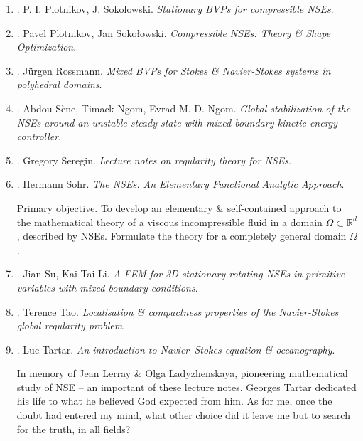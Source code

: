 \documentclass{article}
\begin{document}
\begin{enumerate}
	\item \cite{Plotnikov_Sokolowski2008}. {\sc P. I. Plotnikov, J. Sokolowski}. {\it Stationary BVPs for compressible NSEs}.
	\item \cite{Plotnikov_Sokolowski2012}. {\sc Pavel Plotnikov, Jan Soko\l owski}. {\it Compressible NSEs: Theory \& Shape Optimization}.
	\item \cite{Rossmann2009}. {\sc J\"{u}rgen Rossmann}. {\it Mixed BVPs for Stokes \& Navier-Stokes systems in polyhedral domains}.
	\item \cite{Sene_Ngom_Ngom2019}. {\sc Abdou S\`ene, Timack Ngom, Evrad M. D. Ngom}. {\it Global stabilization of the NSEs around an unstable steady state with mixed boundary kinetic energy controller}.
	\item \cite{Seregin2015}. {\sc Gregory Seregin}. {\it Lecture notes on regularity theory for NSEs}.	 
	\item \cite{Sohr2001,Sohr2013}. {\sc Hermann Sohr}. {\it The NSEs: An Elementary Functional Analytic Approach}.
	
	{\sf Primary objective.} To develop an elementary \& self-contained approach to the mathematical theory of a viscous incompressible fluid in a domain $\Omega\subset\mathbb{R}^d$, described by NSEs. Formulate the theory for a completely general domain $\Omega$.
	\item \cite{Su_Li2008}. {\sc Jian Su, Kai Tai Li}. {\it A FEM for 3D stationary rotating NSEs in primitive variables with mixed boundary conditions}.
	\item \cite{Tao2013}. {\sc Terence Tao}. {\it Localisation \& compactness properties of the Navier-Stokes global regularity problem}.
	\item \cite{Tartar2006}. {\sc Luc Tartar}. {\it An introduction to Navier--Stokes equation \& oceanography}.
	
	In memory of {\sc Jean Lerray \& Olga Ladyzhenskaya}, pioneering mathematical study of NSE -- an important of these lecture notes. {\sc Georges Tartar} dedicated his life to what he believed God expected from him. As for me, once the doubt had entered my mind, what other choice did it leave me but to search for the truth, in all fields?
	

\end{enumerate}
\end{document}
